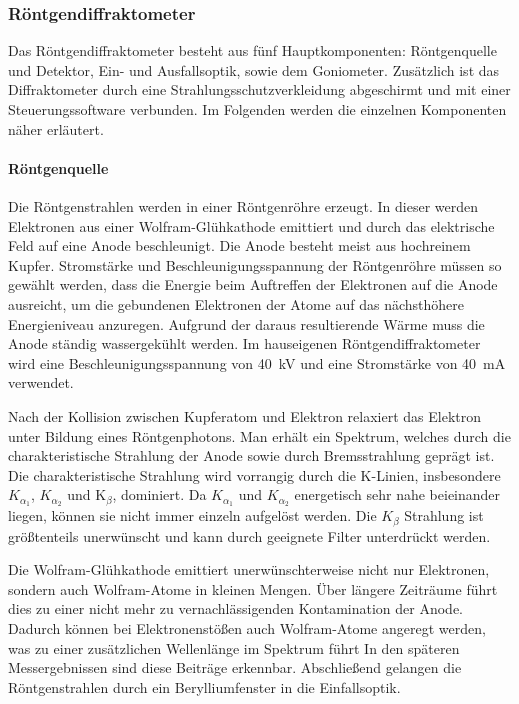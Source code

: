 \subsubsection{Röntgendiffraktometer}
Das Röntgendiffraktometer besteht aus fünf Hauptkomponenten: Röntgenquelle und Detektor, Ein- und Ausfallsoptik,
sowie dem Goniometer.
Zusätzlich ist das Diffraktometer durch eine Strahlungsschutzverkleidung abgeschirmt und mit einer Steuerungssoftware
verbunden.
Im Folgenden werden die einzelnen Komponenten näher erläutert.

\paragraph{Röntgenquelle}
Die Röntgenstrahlen werden in einer Röntgenröhre erzeugt.
In dieser werden Elektronen aus einer Wolfram-Glühkathode emittiert und durch das elektrische Feld auf eine Anode
beschleunigt.
Die Anode besteht meist aus hochreinem Kupfer.
Stromstärke und Beschleunigungsspannung der Röntgenröhre müssen so gewählt werden, dass die Energie beim Auftreffen der
Elektronen auf die Anode ausreicht, um die gebundenen Elektronen der Atome auf das nächsthöhere Energieniveau anzuregen.
Aufgrund der daraus resultierende Wärme muss die Anode ständig wassergekühlt werden.
Im hauseigenen Röntgendiffraktometer wird eine Beschleunigungsspannung von \qty{40}{\kilo\volt} und eine Stromstärke
von \qty{40}{\milli\ampere} verwendet.

Nach der Kollision zwischen Kupferatom und Elektron relaxiert das Elektron unter Bildung eines Röntgenphotons.
Man erhält ein Spektrum, welches durch die charakteristische Strahlung der Anode sowie durch Bremsstrahlung
geprägt ist.
Die charakteristische Strahlung wird vorrangig durch die K-Linien, insbesondere $K_{\alpha_1}$, $K_{\alpha_2}$
und K$_{\beta}$, dominiert.
Da $K_{\alpha_1}$ und $K_{\alpha_2}$ energetisch sehr nahe beieinander liegen, können sie nicht immer einzeln
aufgelöst werden.
Die $K_{\beta}$ Strahlung ist größtenteils unerwünscht und kann durch geeignete Filter unterdrückt werden.

Die Wolfram-Glühkathode emittiert unerwünschterweise nicht nur Elektronen, sondern auch Wolfram-Atome in kleinen Mengen.
Über längere Zeiträume führt dies zu einer nicht mehr zu vernachlässigenden Kontamination der Anode.
Dadurch können bei Elektronenstößen auch Wolfram-Atome angeregt werden, was zu einer zusätzlichen Wellenlänge im
Spektrum führt
In den späteren Messergebnissen sind diese Beiträge erkennbar.
Abschließend gelangen die Röntgenstrahlen durch ein Berylliumfenster in die Einfallsoptik.

